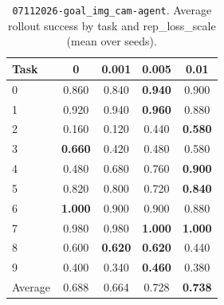 
\begin{table}
\caption{\texttt{07112026-goal\_img\_cam-agent}. Average rollout success by task and rep\_loss\_scale (mean over seeds).}
\label{tab:07112026_goal_img_cam_agent_rep_loss_success}
\begin{tabular}{lcccc}
\toprule
Task & 0 & 0.001 & 0.005 & 0.01 \\
\midrule
0 & 0.860 & 0.840 & \textbf{0.940} & 0.900 \\
1 & 0.920 & 0.940 & \textbf{0.960} & 0.880 \\
2 & 0.160 & 0.120 & 0.440 & \textbf{0.580} \\
3 & \textbf{0.660} & 0.420 & 0.480 & 0.580 \\
4 & 0.480 & 0.680 & 0.760 & \textbf{0.900} \\
5 & 0.820 & 0.800 & 0.720 & \textbf{0.840} \\
6 & \textbf{1.000} & 0.900 & 0.900 & 0.880 \\
7 & 0.980 & 0.980 & \textbf{1.000} & \textbf{1.000} \\
8 & 0.600 & \textbf{0.620} & \textbf{0.620} & 0.440 \\
9 & 0.400 & 0.340 & \textbf{0.460} & 0.380 \\
\midrule
Average & 0.688 & 0.664 & 0.728 & \textbf{0.738} \\
\bottomrule
\end{tabular}
\end{table}



